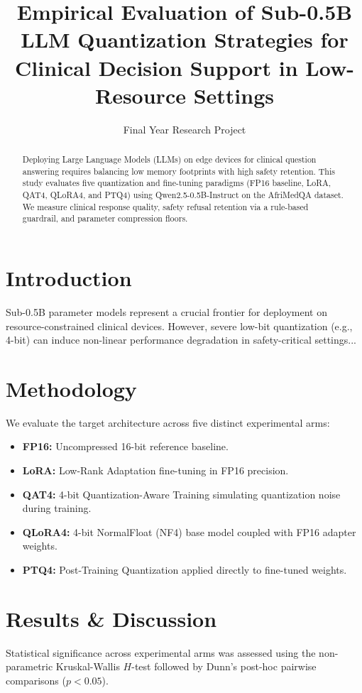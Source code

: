 \documentclass[10pt,journal,compsoc]{IEEEtran}
\title{Empirical Evaluation of Sub-0.5B LLM Quantization Strategies for Clinical Decision Support in Low-Resource Settings}
\author{Final Year Research Project}
\begin{document}
\maketitle

\begin{abstract}
Deploying Large Language Models (LLMs) on edge devices for clinical question answering requires balancing low memory footprints with high safety retention. This study evaluates five quantization and fine-tuning paradigms (FP16 baseline, LoRA, QAT4, QLoRA4, and PTQ4) using Qwen2.5-0.5B-Instruct on the AfriMedQA dataset. We measure clinical response quality, safety refusal retention via a rule-based guardrail, and parameter compression floors.
\end{abstract}

\section{Introduction}
Sub-0.5B parameter models represent a crucial frontier for deployment on resource-constrained clinical devices. However, severe low-bit quantization (e.g., 4-bit) can induce non-linear performance degradation in safety-critical settings...

\section{Methodology}
We evaluate the target architecture across five distinct experimental arms:
\begin{itemize}
    \item \textbf{FP16:} Uncompressed 16-bit reference baseline.
    \item \textbf{LoRA:} Low-Rank Adaptation fine-tuning in FP16 precision.
    \item \textbf{QAT4:} 4-bit Quantization-Aware Training simulating quantization noise during training.
    \item \textbf{QLoRA4:} 4-bit NormalFloat (NF4) base model coupled with FP16 adapter weights.
    \item \textbf{PTQ4:} Post-Training Quantization applied directly to fine-tuned weights.
\end{itemize}

\section{Results \& Discussion}
Statistical significance across experimental arms was assessed using the non-parametric Kruskal-Wallis $H$-test followed by Dunn's post-hoc pairwise comparisons ($p < 0.05$).
\end{document}
